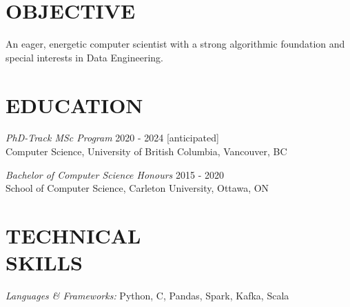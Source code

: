 \documentclass[margin]{res}
\newcommand{\CC}{C\nolinebreak\hspace{-.05em}\raisebox{.4ex}{\tiny\bf +}\nolinebreak\hspace{-.10em}\raisebox{.4ex}{\tiny\bf +}}
\begin{document}
\begin{resume}
\section{OBJECTIVE}  An eager, energetic computer scientist with a strong algorithmic foundation and special 
interests in Data Engineering.  


\section{EDUCATION} 

{\sl PhD-Track MSc Program}  \hfill 2020 - 2024 [anticipated]\\
Computer Science, University of British Columbia, Vancouver, BC

{\sl Bachelor of Computer Science Honours}  \hfill 2015 - 2020\\
School of Computer Science, Carleton University, Ottawa, ON \\

\section{TECHNICAL \\ SKILLS} {\sl Languages \& Frameworks:} Python, \CC, Pandas, Spark, Kafka, Scala


\end{resume}
\end{document}
